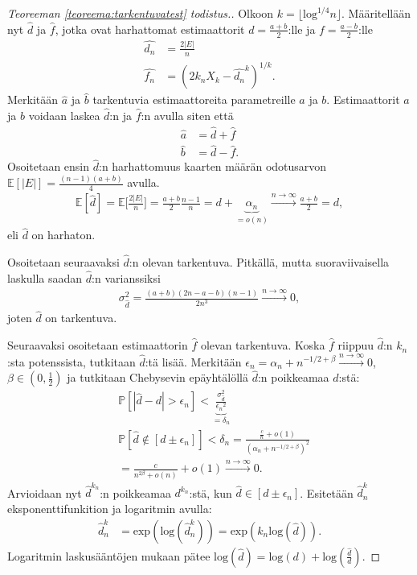\documentclass[finnish,12pt,a4paper,pdftex,sci,utf8]{aaltothesis}
\newcommand\floor[1]{\lfloor#1\rfloor}
\begin{document}
\begin{proof}[Teoreeman \ref{teoreema:tarkentuvatest} todistus.]
	Olkoon $k = \floor{\text{log}^{1/4}n}$. Määritellään nyt $\hat{d}$ ja $\hat{f}$, jotka ovat harhattomat estimaattorit $d = \frac{a+b}{2}$:lle ja $f = \frac{a-b}{2}$:lle
	\begin{align*}
		\hat{d_n} &= \frac{2\left|E\right|}{n} \\
		\hat{f_n} &= (2 k_n X_k - \hat{d_n}^{k})^{1/k}.
	\end{align*}
Merkitään $\hat{a}$ ja $\hat{b}$ tarkentuvia estimaattoreita parametreille $a$ ja $b$. Estimaattorit $a$ ja $b$ voidaan laskea $\hat{d}$:n ja $\hat{f}$:n avulla siten että 
	\begin{align*}
		\hat{a} &= \hat{d} + \hat{f} \\
		\hat{b} &= \hat{d} - \hat{f}.
	\end{align*}
	Osoitetaan ensin $\hat{d}$:n harhattomuus kaarten määrän odotusarvon $\mathbb{E}[|E|] = \frac{(n-1)(a+b)}{4}$ avulla.
	\begin{align*}
		\mathbb{E}[\hat{d}] = \mathbb{E}\bigg[ \frac{2|E|}{n} \bigg] = \frac{a+b}{2}\frac{n-1}{n} = d + \underbrace{\alpha_n}_{= o(n)} \xrightarrow{n \rightarrow \infty}\frac{a+b}{2} = d,
	\end{align*}
	eli $\hat{d}$ on harhaton.

	Osoitetaan seuraavaksi $\hat{d}$:n olevan tarkentuva. Pitkällä, mutta suoraviivaisella laskulla saadan $\hat{d}$:n varianssiksi 
	\begin{align*}
		\sigma_{\hat{d}}^2 = \frac{(a+b)(2n-a-b)(n-1)}{2n^3} \xrightarrow{n \rightarrow \infty} 0,
	\end{align*}
	joten $\hat{d}$ on tarkentuva.

	Seuraavaksi osoitetaan estimaattorin $\hat{f}$ olevan tarkentuva. Koska $\hat{f}$ riippuu $\hat{d}$:n $k_n$:sta potenssista, tutkitaan $\hat{d}$:tä lisää. Merkitään $\epsilon_{n}^{} = \alpha_n + n^{-1/2 + \beta} \xrightarrow{n \rightarrow \infty} 0 $, $\beta \in (0,\frac{1}{2})$ ja tutkitaan Chebysevin epäyhtälöllä $\hat{d}$:n poikkeamaa $d$:stä:
	\begin{align*}
		&\mathbb{P}[|\hat{d} - d| > \epsilon_{n}^{}] < \underbrace{\frac{\sigma_{\hat{d}}^2}{{\epsilon_{n}^{}}^2}}_{ = \delta_n} \\
		&\mathbb{P}[\hat{d} \notin [d \pm  \epsilon_{n}^{}]] < \delta_n = \frac{\frac{c}{n} + o(1)}{(\alpha_n + n^{-1/2 + \beta})^2} \\
		&= \frac{c}{{n^{2 \beta}} +  o(n)} + o(1) \xrightarrow{n \rightarrow \infty} 0.
	\end{align*}
	Arvioidaan nyt $\hat{d}^{k_n}$:n poikkeamaa $d^{k_n}$:stä, kun $\hat{d} \in [d \pm \epsilon_{n}^{}]$.
	Esitetään $\hat{d}^k_n$ eksponenttifunkition ja logaritmin avulla:
	\begin{align*}
		\hat{d}^k_n &= \text{exp}(\text{log}(\hat{d}^k_n)) = \text{exp}(k_n \text{log}(\hat{d})).
	\end{align*}
	Logaritmin laskusääntöjen mukaan pätee $\text{log}(\hat{d}) = \text{log}(d) + \text{log}(\frac{\hat{d}}{d})$.


\end{proof}
\end{document}
